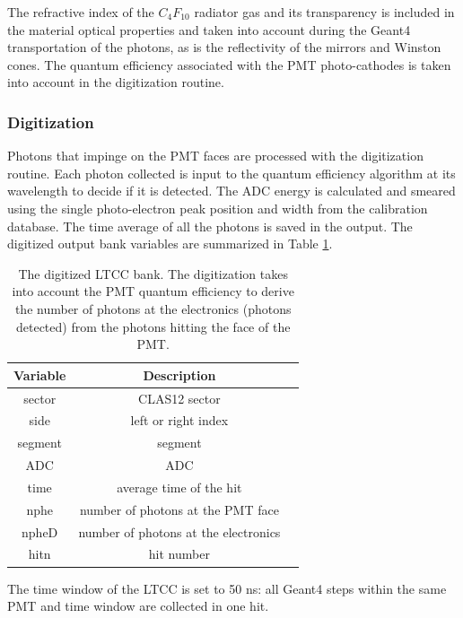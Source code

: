 The refractive index of the $C_4F_{10}$ radiator gas and its transparency is included in the material
optical properties and taken into account during the Geant4 transportation of the photons,
as is the reflectivity of the mirrors and Winston cones.
The quantum efficiency associated with the PMT photo-cathodes is taken into account in
the digitization routine.

\subsubsection{Digitization}

Photons that impinge on the PMT faces are processed with the digitization routine.
Each photon collected is input to the quantum efficiency algorithm at its wavelength to decide if it is detected.
The ADC energy is calculated and smeared using the single photo-electron peak position and width from the calibration database.
The time average of all the photons is saved in the output.
The digitized output bank variables are summarized in Table \ref{tab:ltccBank}.

\begin{table}[h]
	\begin{center}
		\begin{tabular}{| c | c | c |}
			\hline \hline
			Variable & Description                                         \\
			\hline
             sector  &                                     CLAS12 sector     \\
               side  &                               left or right index     \\
            segment  &                                           segment     \\
                ADC  &                                               ADC     \\
               time  &                           average time of the hit     \\
               nphe  &                 number of photons at the PMT face     \\
              npheD  &              number of photons at the electronics     \\
               hitn  &                                        hit number     \\
			\hline \hline
		\end{tabular}
	\end{center}
	\caption{The digitized LTCC bank. The digitization takes into account the PMT quantum efficiency
             to derive the number of photons at the electronics (photons detected) from the photons
             hitting the face of the PMT.}\label{tab:ltccBank}
\end{table}

The time window  of the LTCC is set to 50 ns: all Geant4 steps within the same PMT and time window are collected in one hit.
